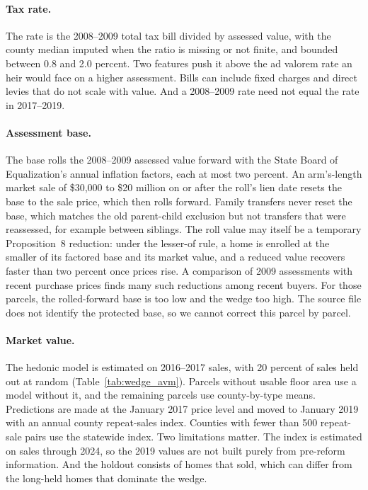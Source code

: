 \paragraph{Tax rate.} The rate is the 2008--2009 total tax bill divided by
assessed value, with the county median imputed when the ratio is missing or
not finite, and bounded between 0.8 and 2.0 percent. Two features push it
above the ad valorem rate an heir would face on a higher assessment. Bills
can include fixed charges and direct levies that do not scale with value.
And a 2008--2009 rate need not equal the rate in 2017--2019.

\paragraph{Assessment base.} The base rolls the 2008--2009 assessed value
forward with the State Board of Equalization's annual inflation factors,
each at most two percent. An arm's-length market sale of \$30,000 to
\$20 million on or after the roll's lien date resets the base to the sale
price, which then rolls forward. Family transfers never reset the base, which
matches the old parent-child exclusion but not transfers that were
reassessed, for example between siblings. The roll value may itself be a
temporary Proposition~8 reduction: under the lesser-of rule, a home is
enrolled at the smaller of its factored base and its market value, and a
reduced value recovers faster than two percent once prices rise. A
comparison of 2009 assessments with recent purchase prices finds many such
reductions among recent buyers. For those parcels, the rolled-forward base is
too low and the wedge too high. The source file does not identify the
protected base, so we cannot correct this parcel by parcel.

\paragraph{Market value.} The hedonic model is estimated on 2016--2017
sales, with 20 percent of sales held out at random
(Table~\ref{tab:wedge_avm}). Parcels without usable floor area use a model
without it, and the remaining parcels use county-by-type means. Predictions
are made at the January 2017 price level and moved to January 2019 with an
annual county repeat-sales index. Counties with fewer than 500 repeat-sale
pairs use the statewide index. Two limitations matter. The index is
estimated on sales through 2024, so the 2019 values are not built purely from
pre-reform information. And the holdout consists of homes that sold, which
can differ from the long-held homes that dominate the wedge.

